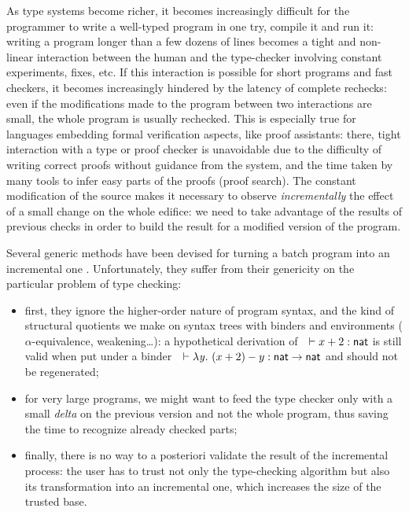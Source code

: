 \documentclass{llncs}
\begin{document}
As type systems become richer, it becomes increasingly difficult for
the programmer to write a well-typed program in one try, compile it
and run it: writing a program longer than a few dozens of lines
becomes a tight and non-linear interaction between the human and the
type-checker involving constant experiments, fixes, etc. If this
interaction is possible for short programs and fast checkers, it
becomes increasingly hindered by the latency of complete rechecks:
even if the modifications made to the program between two interactions
are small, the whole program is usually rechecked. This is especially
true for languages embedding formal verification aspects, like proof
assistants: there, tight interaction with a type or proof checker is
unavoidable due to the difficulty of writing correct proofs without
guidance from the system, and the time taken by many tools to infer
easy parts of the proofs (proof search). The constant modification of
the source makes it necessary to observe \emph{incrementally} the
effect of a small change on the whole edifice: we need to take
advantage of the results of previous checks in order to build the
result for a modified version of the program.

Several generic methods have been devised for turning a batch program
into an incremental one
\cite{pugh1989incremental,acar2003selective}. Unfortunately, they
suffer from their genericity on the particular problem of type
checking:
\begin{itemize}
\item first, they ignore the higher-order nature of program syntax,
  and the kind of structural quotients we make on syntax trees with
  binders and environments ($\alpha$-equivalence, weakening\ldots): a
  hypothetical derivation of\ \ $\vdash x+2 : \text{\textsf{nat}}$ is still valid
  when put under a binder\ \ $\vdash\lambda{\ensuremath{\text{\textit{y}}}}.\  (x + 2) -
  y:\text{\textsf{nat}}\to\text{\textsf{nat}}$ and should not be regenerated;
\item for very large programs, we might want to feed the type checker
  only with a small \emph{delta} on the previous version and not the
  whole program, thus saving the time to recognize already checked
  parts;
\item finally, there is no way to a posteriori validate the result of
  the incremental process: the user has to trust not only the
  type-checking algorithm but also its transformation into an
  incremental one, which increases the size of the trusted base.
\end{itemize}
\end{document}
